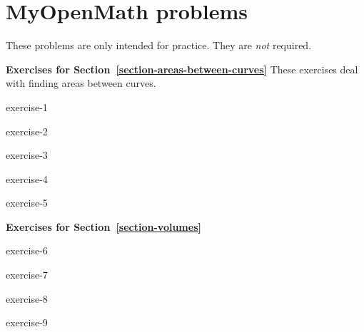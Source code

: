 \documentclass[10pt,]{book}
\numberwithin{equation}{section}
\begin{document}
\section[{MyOpenMath problems}]{MyOpenMath problems}\hypertarget{exercises-1}{}
\begin{introduction}{}%
\hypertarget{p-775}{}%
These problems are only intended for practice. They are \emph{not} required.%
\end{introduction}%
\par\medskip\noindent%
\textbf{Exercises for Section~\ref*{section-areas-between-curves}}\space\space\hypertarget{exercisegroup-1}{}%
\hypertarget{p-776}{}%
These exercises deal with finding areas between curves.%
\begin{exercisegroup}{1}
\begin{divisionexercise}{1}{}{}{exercise-1}%
\end{divisionexercise}%
\begin{divisionexercise}{2}{}{}{exercise-2}%
\end{divisionexercise}%
\begin{divisionexercise}{3}{}{}{exercise-3}%
\end{divisionexercise}%
\begin{divisionexercise}{4}{}{}{exercise-4}%
\end{divisionexercise}%
\begin{divisionexercise}{5}{}{}{exercise-5}%
\end{divisionexercise}%
\end{exercisegroup}
\par\medskip\noindent
\par\medskip\noindent%
\textbf{Exercises for Section~\ref*{section-volumes}}\space\space\hypertarget{exercisegroup-2}{}%
\begin{exercisegroup}{1}
\begin{divisionexercise}{6}{}{}{exercise-6}%
\end{divisionexercise}%
\begin{divisionexercise}{7}{}{}{exercise-7}%
\end{divisionexercise}%
\begin{divisionexercise}{8}{}{}{exercise-8}%
\end{divisionexercise}%
\begin{divisionexercise}{9}{}{}{exercise-9}%
\end{divisionexercise}%
\end{exercisegroup}
\par\medskip\noindent
\par\medskip\noindent%
\end{document}
